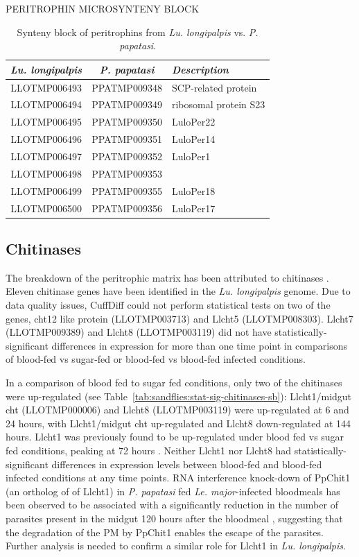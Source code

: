 \begin{table}[H]
  \centering
  \caption{PERITROPHIN MICROSYNTENY BLOCK}
  \begin{tabular}{c c l} \hline
    \emph{Lu. longipalpis} & \emph{P. papatasi} & \emph{Description} \\ \hline
    LLOTMP006493 & PPATMP009348 & SCP-related protein \\
    LLOTMP006494 & PPATMP009349 & ribosomal protein S23 \\
    LLOTMP006495 & PPATMP009350 & LuloPer22 \\
    LLOTMP006496 & PPATMP009351 & LuloPer14 \\
    LLOTMP006497 & PPATMP009352 & LuloPer1 \\
    LLOTMP006498 & PPATMP009353 &  \\
    LLOTMP006499 & PPATMP009355 & LuloPer18 \\
    LLOTMP006500 & PPATMP009356 & LuloPer17
  \end{tabular}
  \caption*{Synteny block of peritrophins from \emph{Lu. longipalpis} vs. \emph{P. papatasi}.}
  \label{tab:synteny-llot-ppat-peritrophic}
\end{table}


\subsection{Chitinases}
The breakdown of the peritrophic matrix has been attributed to chitinases \cite{Dostalova2012}. Eleven chitinase genes have been identified in the \emph{Lu. longipalpis} genome. Due to data quality issues, CuffDiff could not perform statistical tests on two of the genes, cht12 like protein (LLOTMP003713) and Llcht5 (LLOTMP008303). Llcht7 (LLOTMP009389) and Llcht8 (LLOTMP003119) did not have statistically-significant differences in expression for more than one time point in comparisons of blood-fed vs sugar-fed or blood-fed vs blood-fed infected conditions.


In a comparison of blood fed to sugar fed conditions, only two of the chitinases were up-regulated (see Table~\ref{tab:sandflies:stat-sig-chitinases-sb}): Llcht1/midgut cht (LLOTMP000006) and Llcht8 (LLOTMP003119) were up-regulated at 6 and 24 hours, with Llcht1/midgut cht up-regulated and Llcht8 down-regulated at 144 hours.  Llcht1 was previously found to be up-regulated under blood fed vs sugar fed conditions, peaking at 72 hours \cite{Ramalho-Ortigao2003}. Neither Llcht1 nor Llcht8 had statistically-significant differences in expression levels between blood-fed and blood-fed infected conditions at any time points. RNA interference knock-down of PpChit1 (an ortholog of of Llcht1) in \emph{P. papatasi} fed \emph{Le. major}-infected bloodmeals has been observed to be associated with a significantly reduction in the number of parasites present in the midgut 120 hours after the bloodmeal \cite{Coutinho-abreu2010}, suggesting that the degradation of the PM by PpChit1 enables the escape of the parasites.  Further analysis is needed to confirm a similar role for Llcht1 in \emph{Lu. longipalpis}. 

